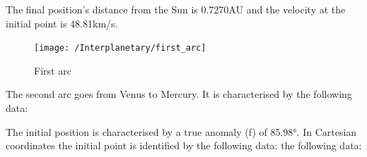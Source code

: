 \documentclass[11pt,a4paper]{report}
\begin{document}
\begin{table}[H]
\centering
{}
\end{table}

The final position’s distance from the Sun is 0.7270AU and the velocity at the initial point is 48.81km/s.

\begin{figure}[H]
\centering
\texttt{[image: /Interplanetary/first\_arc]}
\caption{First arc}
\end{figure}

The second arc goes from Venus to Mercury. It is characterised by the following data:

\begin{table}[H]
\centering
{}
\end{table}

The initial position is characterised by a true anomaly (f) of 85.98°. In Cartesian coordinates the initial point is identified by the following data:
the following data:

\begin{table}[H]
\centering
{}
\end{table}
\end{document}
